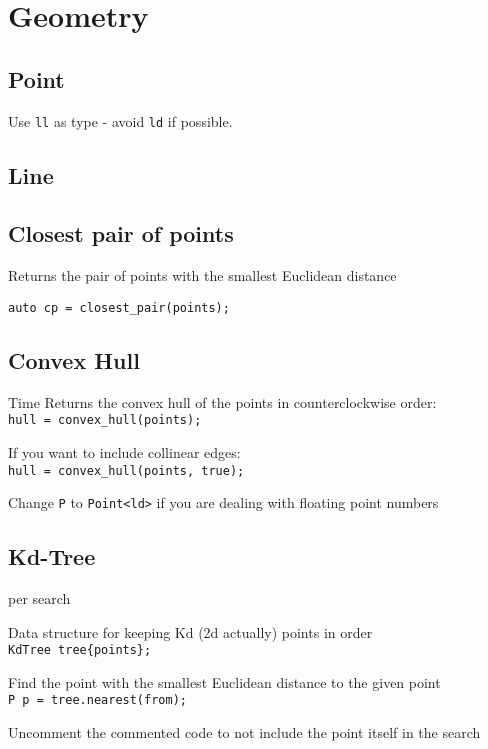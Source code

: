 \section{Geometry}

\subsection{Point}
Use \verb|ll| as type - avoid \verb|ld| if possible.



\subsection{Line}



\subsection{Closest pair of points}

Returns the pair of points with the smallest Euclidean distance

\verb|auto cp = closest_pair(points);|



\subsection{Convex Hull}
 Time
Returns the convex hull of the points in counterclockwise order: \\
\verb|hull = convex_hull(points);|

If you want to include collinear edges: \\
\verb|hull = convex_hull(points, true);|

Change \verb|P| to \verb|Point<ld>| if you are dealing with floating point numbers



\subsection{Kd-Tree}
 per search

Data structure for keeping Kd (2d actually) points in order \\
\verb|KdTree tree{points};|

Find the point with the smallest Euclidean distance to the given point \\
\verb|P p = tree.nearest(from);|

Uncomment the commented code to not include the point itself in the search

